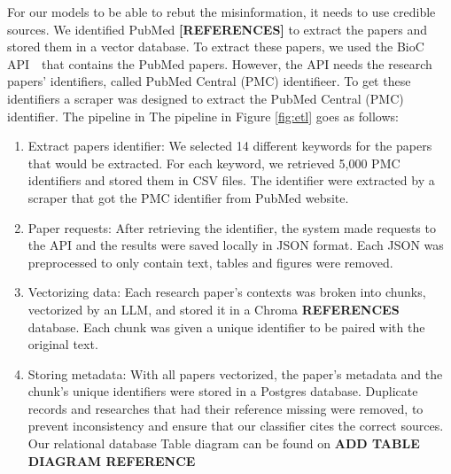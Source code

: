 For our models to be able to rebut the misinformation, it needs to use credible sources. We identified PubMed \textbf{[REFERENCES]} to extract the papers and stored them in a vector database.
To extract these papers, we used the BioC API \cite{bioinformatics} that contains the PubMed papers. However, the API needs the research papers' identifiers, called PubMed Central (PMC) identifieer.
To get these identifiers a scraper was designed to extract the PubMed Central (PMC) identifier. The pipeline in The pipeline in Figure \ref{fig:etl} goes as follows:
\begin{enumerate}
	\item Extract papers identifier: We selected 14 different keywords for the papers that would be extracted. For each keyword, we retrieved 5,000 PMC identifiers and stored them in CSV files. The identifier were extracted by a scraper that got the
	PMC identifier from PubMed website.
	\item Paper requests: After retrieving the identifier, the system made requests to the API and the results were saved locally in JSON format. Each JSON was preprocessed to only contain text, tables and figures were removed.
	\item Vectorizing data: Each research paper's contexts was broken into chunks, vectorized by an LLM, and stored it in a Chroma \textbf{REFERENCES} database. Each chunk was given a unique identifier to be paired with the original text. 
	\item Storing metadata: With all papers vectorized, the paper's metadata and the chunk's unique identifiers were stored in a Postgres database. Duplicate records and researches that had their reference missing were removed, to prevent
	inconsistency and ensure that our classifier cites the correct sources. Our relational database Table diagram can be found on \textbf{ADD TABLE DIAGRAM REFERENCE}




    


\end{enumerate}

